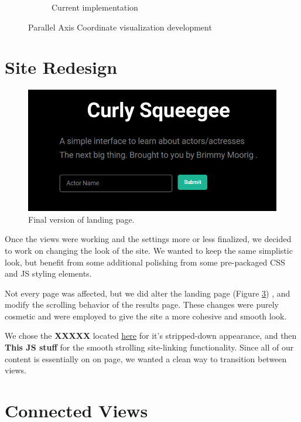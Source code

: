 \documentclass[12pt]{article}
\begin{document}
\begin{figure}[h!]
\begin{subfigure}[t]{.8\textwidth}
			  \caption{Current implementation}
			  \label{fig:sub2}
		\end{subfigure}%
		\caption{Parallel Axis Coordinate visualization development}
		\label{fig:parallelAxisCoordVis}
	\end{figure}



\section{Site Redesign}

\begin{figure}\label{fig:blackLandingPage}
\centering
\includegraphics[scale=0.3]{images/landingBoxFinal.png}
\caption{Final version of landing page.}
\end{figure}


Once the views were working and the settings more or less finalized, we decided to work on changing the look of the site.  We wanted to keep the same simplistic look, but benefit from some additional polishing from some pre-packaged CSS and JS styling elements. 

Not every page was affected, but we did alter the landing page (Figure \ref{fig:blackLandingPage}) , and modify the scrolling behavior of the results page.  These changes were purely cosmetic and were employed to give the site a more cohesive and smooth look.




We chose the \textbf{XXXXX} located \href{www.google.com}{here} for it's stripped-down appearance, and then \textbf{This JS stuff} for the smooth strolling site-linking functionality.  Since all of our content is essentially on on page, we wanted a clean way to transition between views.

\section{Connected Views}
\end{document}
